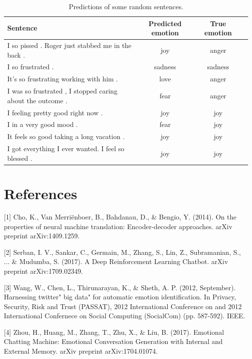 \documentclass{article}
\begin{document}
\begin{table}[tbph]
\centering  %
\begin{tabular}{lccc}  %
\hline
Sentence &Predicted emotion &True emotion\\ \hline  %
I so pissed . Roger just stabbed me in the back . &joy &anger \\         %
I so frustrated . &sadness &sadness \\        %
It's so frustrating working with him . &love &anger\\ 
I was so frustrated , I stopped caring about the outcome . &fear &anger \\
I feeling pretty good right now . &joy &joy \\
I in a very good mood . &fear &joy \\
It feels so good taking a long vacation . &joy &joy \\
I got everything I ever wanted. I feel so blessed . &joy &joy \\ \hline
\end{tabular}
\caption{Predictions of some random sentences.}
\label{sentence}
\end{table}


















\newpage

\section*{References}

[1] Cho, K., Van Merriënboer, B., Bahdanau, D., \& Bengio, Y. (2014). On the properties of neural machine translation: Encoder-decoder approaches. arXiv preprint arXiv:1409.1259.


[2] Serban, I. V., Sankar, C., Germain, M., Zhang, S., Lin, Z., Subramanian, S., ... \& Mudumba, S. (2017). A Deep Reinforcement Learning Chatbot. arXiv preprint arXiv:1709.02349.

[3] Wang, W., Chen, L., Thirunarayan, K., \& Sheth, A. P. (2012, September). Harnessing twitter" big data" for automatic emotion identification. In Privacy, Security, Risk and Trust (PASSAT), 2012 International Conference on and 2012 International Confernece on Social Computing (SocialCom) (pp. 587-592). IEEE.

[4] Zhou, H., Huang, M., Zhang, T., Zhu, X., \& Liu, B. (2017). Emotional Chatting Machine: Emotional Conversation Generation with Internal and External Memory. arXiv preprint arXiv:1704.01074.
\end{document}
